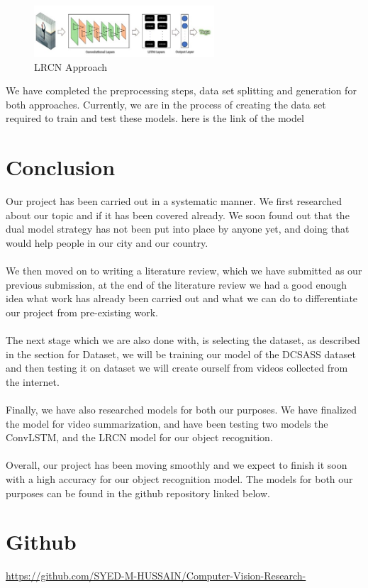 \documentclass[title page]{article}
\begin{document}
\begin{figure}[h]
    \centering
    \includegraphics[width=0.6\textwidth]{Picture3.jpg}
    \caption{LRCN Approach}
    \label{fig:3}
\end{figure}

We have completed the preprocessing steps, data set splitting and generation for both approaches. Currently, we are in the process of creating the data set required to train and test these models. here is the link of the model 

\section{Conclusion}

Our project has been carried out in a systematic manner. We first researched about our topic and if it has been covered already. We soon found out that the dual model strategy has not been put into place by anyone yet, and doing that would help people in our city and our country. 
\\ \\
We then moved on to writing a literature review, which we have submitted as our previous submission, at the end of the literature review we had a good enough idea what work has already been carried out and what we can do to differentiate our project from pre-existing work. 
\\ \\
The next stage which we are also done with, is selecting the dataset, as described in the section for Dataset, we will be training our model of the DCSASS dataset and then testing it on dataset we will create ourself from videos collected from the internet.
\\ \\
Finally, we have also researched models for both our purposes. We have finalized the model for video summarization, and have been testing two models the ConvLSTM, and the LRCN model for our object recognition. 
\\ \\
Overall, our project has been moving smoothly and we expect to finish it soon with a high accuracy for our object recognition model. The models for both our purposes can be found in the github repository linked below. 

\section{Github}

\href{https://github.com/SYED-M-HUSSAIN/Computer-Vision-Research-}{https://github.com/SYED-M-HUSSAIN/Computer-Vision-Research-}
\end{document}
